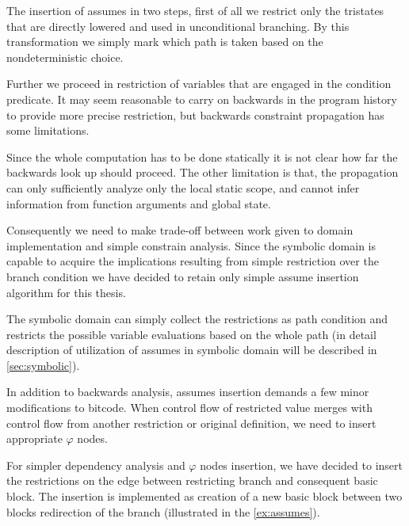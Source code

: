 The insertion of assumes in two steps, first of all we restrict only the
tristates that are directly lowered and used in unconditional branching. By this
transformation we simply mark which path is taken based on the nondeterministic
choice.

Further we proceed in restriction of variables that are engaged in the condition
predicate. It may seem reasonable to carry on backwards in the program history to
provide more precise restriction, but backwards constraint propagation has some
limitations.


Since the whole computation has to be done statically it is not clear how far the
backwards look up should proceed. The other limitation is that, the propagation
can only sufficiently analyze only the local static scope, and cannot infer
information from function arguments and global state.

Consequently we need to make trade-off between work given to domain
implementation and simple constrain analysis. Since the symbolic domain is
capable to acquire the implications resulting from simple restriction over the
branch condition we have decided to retain only simple assume insertion
algorithm for this thesis.

The symbolic domain can simply collect the restrictions as path condition and
restricts the possible variable evaluations based on the whole path
(in detail description of utilization of assumes in symbolic domain will be
described in \autoref{sec:symbolic}).

In addition to backwards analysis, assumes insertion demands a few minor
modifications to bitcode. When control flow of restricted value merges with
control flow from another restriction or original definition, we need to insert
appropriate $\varphi$ nodes.

For simpler dependency analysis and $\varphi$ nodes insertion, we have decided
to insert the restrictions on the edge between restricting branch and consequent
basic block. The insertion is implemented as creation of a new basic block
between two blocks redirection of the branch (illustrated in the
\autoref{ex:assumes}).

